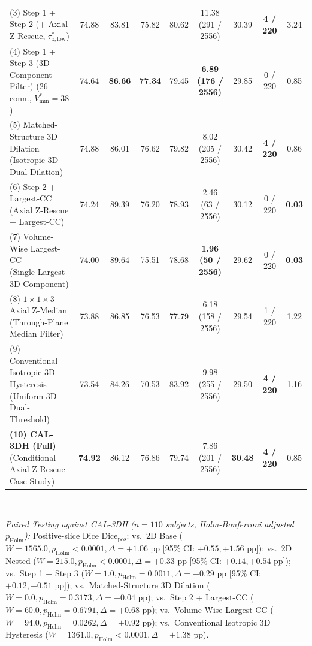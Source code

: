 \documentclass[11pt,a4paper]{article}
\begin{document}
\begin{table}[tbp]
{\begin{tabular}{lcccccccc}
\shortstack[l]{(3) Step 1 + Step 2 \\ \phantom{(3) }(+ Axial Z-Rescue, $\tau_{z,\mathrm{low}}^*$)} & 74.88 & 83.81 & 75.82 & 80.62 & 11.38 (291 / 2556) & 30.39 & \textbf{4 / 220} & 3.24 \\
\shortstack[l]{(4) Step 1 + Step 3 (3D Component Filter) \\ \phantom{(4) }(26-conn., $V_{\min}^* = 38$)} & 74.64 & \textbf{86.66} & \textbf{77.34} & 79.45 & \textbf{6.89 (176 / 2556)} & 29.85 & 0 / 220 & 0.85 \\
\shortstack[l]{(5) Matched-Structure 3D Dilation \\ \phantom{(5) }(Isotropic 3D Dual-Dilation)} & 74.88 & 86.01 & 76.62 & 79.82 & 8.02 (205 / 2556) & 30.42 & \textbf{4 / 220} & 0.86 \\
\shortstack[l]{(6) Step 2 + Largest-CC \\ \phantom{(6) }(Axial Z-Rescue + Largest-CC)} & 74.24 & 89.39 & 76.20 & 78.93 & 2.46 (63 / 2556) & 30.12 & 0 / 220 & \textbf{0.03} \\
\shortstack[l]{(7) Volume-Wise Largest-CC \\ \phantom{(7) }(Single Largest 3D Component)} & 74.00 & 89.64 & 75.51 & 78.68 & \textbf{1.96 (50 / 2556)} & 29.62 & 0 / 220 & \textbf{0.03} \\
\shortstack[l]{(8) $1 \times 1 \times 3$ Axial Z-Median \\ \phantom{(8) }(Through-Plane Median Filter)} & 73.88 & 86.85 & 76.53 & 77.79 & 6.18 (158 / 2556) & 29.54 & 1 / 220 & 1.22 \\
\shortstack[l]{(9) Conventional Isotropic 3D Hysteresis \\ \phantom{(9) }(Uniform 3D Dual-Threshold)} & 73.54 & 84.26 & 70.53 & 83.92 & 9.98 (255 / 2556) & 29.50 & \textbf{4 / 220} & 1.16 \\
\shortstack[l]{\textbf{(10) CAL-3DH (Full)} \\ \phantom{(10) }(Conditional Axial Z-Rescue Case Study)} & \textbf{74.92} & 86.12 & 76.86 & 79.74 & 7.86 (201 / 2556) & \textbf{30.48} & \textbf{4 / 220} & 0.85 \\
\bottomrule
\end{tabular}%
}
\\[4pt]
\begin{minipage}{\textwidth}
\scriptsize
\textit{Paired Testing against CAL-3DH ($n=110$ subjects, Holm-Bonferroni adjusted $p_{\text{Holm}}$):}
Positive-slice Dice $\text{Dice}_{\text{pos}}$: vs.\ 2D Base ($W=1565.0, p_{\text{Holm}} < 0.0001, \Delta = +1.06\text{ pp}$ [95\% CI: $+0.55, +1.56\text{ pp}$]); vs.\ 2D Nested ($W=215.0, p_{\text{Holm}} < 0.0001, \Delta = +0.33\text{ pp}$ [95\% CI: $+0.14, +0.54\text{ pp}$]); vs.\ Step 1 + Step 3 ($W=1.0, p_{\text{Holm}} = 0.0011, \Delta = +0.29\text{ pp}$ [95\% CI: $+0.12, +0.51\text{ pp}$]); vs.\ Matched-Structure 3D Dilation ($W=0.0, p_{\text{Holm}} = 0.3173, \Delta = +0.04\text{ pp}$); vs.\ Step 2 + Largest-CC ($W=60.0, p_{\text{Holm}} = 0.6791, \Delta = +0.68\text{ pp}$); vs.\ Volume-Wise Largest-CC ($W=94.0, p_{\text{Holm}} = 0.0262, \Delta = +0.92\text{ pp}$); vs.\ Conventional Isotropic 3D Hysteresis ($W=1361.0, p_{\text{Holm}} < 0.0001, \Delta = +1.38\text{ pp}$).\\

\end{minipage}
\end{table}
\end{document}
